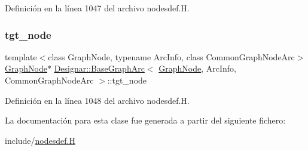 Definición en la línea 1047 del archivo nodesdef.\+H.

\mbox{\label{class_designar_1_1_base_graph_arc_af09ee39743d9a2e6f7bad479d925c273}} 
\subsubsection{\texorpdfstring{tgt\+\_\+node}{tgt\_node}}
{\footnotesize\ttfamily template$<$class Graph\+Node, typename Arc\+Info, class Common\+Graph\+Node\+Arc$>$ \\
\hyperlink{class_designar_1_1_graph_node}{Graph\+Node}$\ast$ \hyperlink{class_designar_1_1_base_graph_arc}{Designar\+::\+Base\+Graph\+Arc}$<$ \hyperlink{class_designar_1_1_graph_node}{Graph\+Node}, Arc\+Info, Common\+Graph\+Node\+Arc $>$\+::tgt\+\_\+node\hspace{0.3cm}{\ttfamily [protected]}}



Definición en la línea 1048 del archivo nodesdef.\+H.



La documentación para esta clase fue generada a partir del siguiente fichero\+:\begin{DoxyCompactItemize}
\item 
include/\hyperlink{nodesdef_8_h}{nodesdef.\+H}\end{DoxyCompactItemize}
